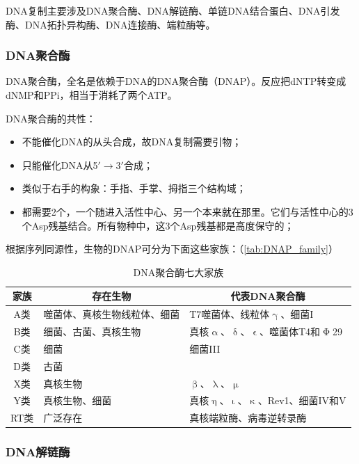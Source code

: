 DNA复制主要涉及DNA聚合酶、DNA解链酶、单链DNA结合蛋白、DNA引发酶、DNA拓扑异构酶、DNA连接酶、端粒酶等。

\subsubsection{DNA聚合酶}

DNA聚合酶，全名是依赖于DNA的DNA聚合酶（DNAP）。反应把dNTP转变成dNMP和PPi，相当于消耗了两个ATP。

DNA聚合酶的共性：

\begin{itemize}
	\item 不能催化DNA的从头合成，故DNA复制需要引物；
	\item 只能催化DNA从5$\prime$$\longrightarrow$3$\prime$合成；
	\item 类似于右手的构象：手指、手掌、拇指三个结构域；
	\item 都需要2个，一个随进入活性中心、另一个本来就在那里。它们与活性中心的3个Asp残基结合。所有物种中，这3个Asp残基都是高度保守的；
\end{itemize}

	根据序列同源性，生物的DNAP可分为下面这些家族：（\autoref{tab:DNAP_family}）
	\begin{table}[htbp]
		\centering
		\begin{tabularx}{\textwidth}{|c|l|X|}
			\hline
			\textbf{家族} & \multicolumn{1}{c|}{\textbf{存在生物}} & \multicolumn{1}{c|}{\textbf{代表DNA聚合酶}} \\ \hline
			A类 & 噬菌体、真核生物线粒体、细菌 & T7噬菌体、线粒体$\upgamma$、细菌I \\ \hline
			B类 & 细菌、古菌、真核生物 & 真核$\upalpha$、$\updelta$、$\upvarepsilon$、噬菌体T4和$\upPhi$29 \\ \hline
			C类 & 细菌 & 细菌III \\ \hline
			D类 & 古菌 &  \\ \hline
			X类 & 真核生物 & $\upbeta$、$\uplambda$、$\upmu$ \\ \hline
			Y类 & 真核生物、细菌 & 真核$\upeta$、$\upiota$、$\upkappa$、Rev1、细菌IV和V \\ \hline
			RT类 & 广泛存在 & 真核端粒酶、病毒逆转录酶 \\ \hline
		\end{tabularx}
		\caption{DNA聚合酶七大家族}
		\label{tab:DNAP_family}
	\end{table}

\subsubsection{DNA解链酶}


